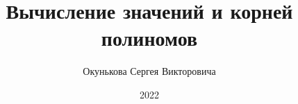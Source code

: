 \documentclass[spec, och, labwork]{shiza}
\begin{document}
\chair{}

\title{Вычисление значений и корней полиномов}






\author{Окунькова Сергея Викторовича}








\date{2022}

\maketitle

\end{document}
